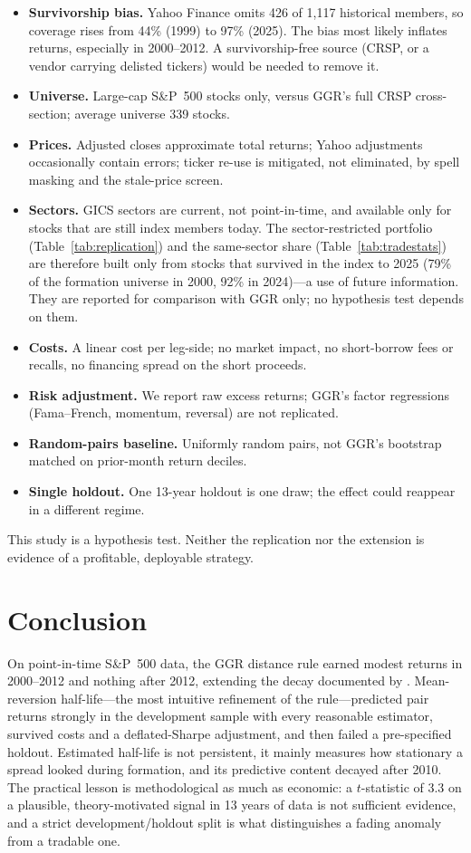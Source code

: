 \documentclass[11pt]{article}
\begin{document}
\begin{itemize}
\item \textbf{Survivorship bias.} Yahoo Finance omits 426 of 1,117 historical members, so coverage rises from 44\% (1999) to 97\% (2025). The bias most likely inflates returns, especially in 2000--2012. A survivorship-free source (CRSP, or a vendor carrying delisted tickers) would be needed to remove it.
\item \textbf{Universe.} Large-cap S\&P~500 stocks only, versus GGR's full CRSP cross-section; average universe 339 stocks.
\item \textbf{Prices.} Adjusted closes approximate total returns; Yahoo adjustments occasionally contain errors; ticker re-use is mitigated, not eliminated, by spell masking and the stale-price screen.
\item \textbf{Sectors.} GICS sectors are current, not point-in-time, and available only for stocks that are still index members today. The sector-restricted portfolio (Table~\ref{tab:replication}) and the same-sector share (Table~\ref{tab:tradestats}) are therefore built only from stocks that survived in the index to 2025 (79\% of the formation universe in 2000, 92\% in 2024)---a use of future information. They are reported for comparison with GGR only; no hypothesis test depends on them.
\item \textbf{Costs.} A linear cost per leg-side; no market impact, no short-borrow fees or recalls, no financing spread on the short proceeds.
\item \textbf{Risk adjustment.} We report raw excess returns; GGR's factor regressions (Fama--French, momentum, reversal) are not replicated.
\item \textbf{Random-pairs baseline.} Uniformly random pairs, not GGR's bootstrap matched on prior-month return deciles.
\item \textbf{Single holdout.} One 13-year holdout is one draw; the effect could reappear in a different regime.
\end{itemize}

This study is a hypothesis test. Neither the replication nor the extension is evidence of a profitable, deployable strategy.

\section{Conclusion}

On point-in-time S\&P~500 data, the GGR distance rule earned modest returns in 2000--2012 and nothing after 2012, extending the decay documented by \citet{dofaff2010}. Mean-reversion half-life---the most intuitive refinement of the rule---predicted pair returns strongly in the development sample with every reasonable estimator, survived costs and a deflated-Sharpe adjustment, and then failed a pre-specified holdout. Estimated half-life is not persistent, it mainly measures how stationary a spread looked during formation, and its predictive content decayed after 2010. The practical lesson is methodological as much as economic: a $t$-statistic of 3.3 on a plausible, theory-motivated signal in 13 years of data is not sufficient evidence, and a strict development/holdout split is what distinguishes a fading anomaly from a tradable one.
\end{document}
